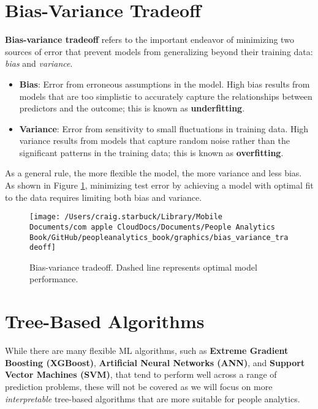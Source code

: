 \documentclass[
]{book}
\providecommand{\tightlist}{%
  \setlength{\itemsep}{0pt}\setlength{\parskip}{0pt}}
\begin{document}
\hypertarget{bias-variance-tradeoff}{%
\section{Bias-Variance Tradeoff}\label{bias-variance-tradeoff}}

\textbf{Bias-variance tradeoff} refers to the important endeavor of minimizing two sources of error that prevent models from generalizing beyond their training data: \emph{bias} and \emph{variance}.

\begin{itemize}
\tightlist
\item
  \textbf{Bias}: Error from erroneous assumptions in the model. High bias results from models that are too simplistic to accurately capture the relationships between predictors and the outcome; this is known as \textbf{underfitting}.
\item
  \textbf{Variance}: Error from sensitivity to small fluctuations in training data. High variance results from models that capture random noise rather than the significant patterns in the training data; this is known as \textbf{overfitting}.
\end{itemize}

As a general rule, the more flexible the model, the more variance and less bias. As shown in Figure \ref{fig:bias-var-tradeoff}, minimizing test error by achieving a model with optimal fit to the data requires limiting both bias and variance.

\begin{figure}

{\centering \texttt{[image: /Users/craig.starbuck/Library/Mobile Documents/com~apple~CloudDocs/Documents/People Analytics Book/GitHub/peopleanalytics\_book/graphics/bias\_variance\_tradeoff]} 

}

\caption{Bias-variance tradeoff. Dashed line represents optimal model performance.}\label{fig:bias-var-tradeoff}
\end{figure}

\hypertarget{tree-based-algorithms}{%
\section{Tree-Based Algorithms}\label{tree-based-algorithms}}

While there are many flexible ML algorithms, such as \textbf{Extreme Gradient Boosting (XGBoost)}, \textbf{Artificial Neural Networks (ANN)}, and \textbf{Support Vector Machines (SVM)}, that tend to perform well across a range of prediction problems, these will not be covered as we will focus on more \emph{interpretable} tree-based algorithms that are more suitable for people analytics.
\end{document}
